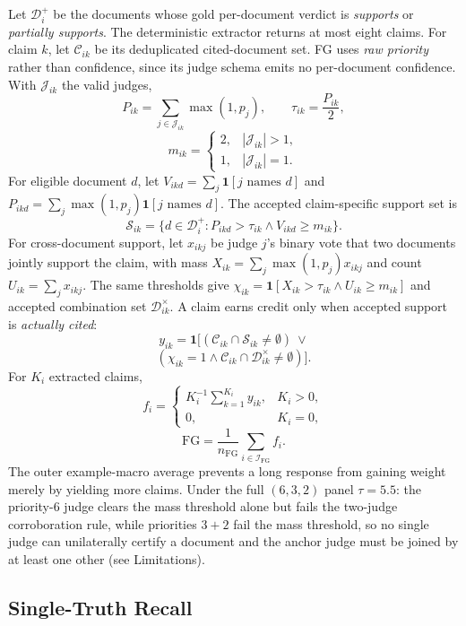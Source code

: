 Let $\mathcal{D}_i^{+}$ be the documents whose gold per-document verdict is
\textit{supports} or \textit{partially supports}. The deterministic extractor
returns at most eight claims. For claim $k$, let $\mathcal{C}_{ik}$ be its
deduplicated cited-document set. FG uses \emph{raw priority} rather than
confidence, since its judge schema emits no per-document confidence. With
$\mathcal{J}_{ik}$ the valid judges,
\[
P_{ik}=\!\!\sum_{j\in\mathcal{J}_{ik}}\!\!\max(1,p_j),\qquad
\tau_{ik}=\frac{P_{ik}}{2},
\]
\[
m_{ik}=\begin{cases}2,&|\mathcal{J}_{ik}|>1,\\ 1,&|\mathcal{J}_{ik}|=1.\end{cases}
\]
For eligible document $d$, let $V_{ikd}=\sum_j\mathbf{1}[j\text{ names }d]$ and
$P_{ikd}=\sum_j\max(1,p_j)\mathbf{1}[j\text{ names }d]$. The accepted
claim-specific support set is
\[
\mathcal{S}_{ik}=\{d\in\mathcal{D}_i^{+} : P_{ikd}>\tau_{ik} \wedge V_{ikd}\geq m_{ik}\}.
\]
For cross-document support, let $x_{ikj}$ be judge $j$'s binary vote that two
documents jointly support the claim, with mass $X_{ik}=\sum_j\max(1,p_j)x_{ikj}$
and count $U_{ik}=\sum_j x_{ikj}$. The same thresholds give
$\chi_{ik}=\mathbf{1}[X_{ik}>\tau_{ik}\wedge U_{ik}\geq m_{ik}]$ and accepted
combination set $\mathcal{D}^{\times}_{ik}$. A claim earns credit only when
accepted support is \emph{actually cited}:
\[
y_{ik}=\mathbf{1}\big[(\mathcal{C}_{ik}\cap\mathcal{S}_{ik}\neq\emptyset)
\ \vee
\]
\[
(\chi_{ik}=1 \wedge \mathcal{C}_{ik}\cap\mathcal{D}^{\times}_{ik}\neq\emptyset)\big].
\]
For $K_i$ extracted claims,
\[
f_i=\begin{cases}K_i^{-1}\sum_{k=1}^{K_i}y_{ik},&K_i>0,\\ 0,&K_i=0,\end{cases}
\]
\[
\mathrm{FG}=\frac{1}{n_{\mathrm{FG}}}\sum_{i\in\mathcal{I}_{\mathrm{FG}}}f_i.
\]
The outer example-macro average prevents a long response from gaining weight
merely by yielding more claims. Under the full $(6,3,2)$ panel $\tau=5.5$: the
priority-6 judge clears the mass threshold alone but fails the two-judge
corroboration rule, while priorities $3+2$ fail the mass threshold, so no single
judge can unilaterally certify a document and the anchor judge must be joined by
at least one other (see Limitations).

\subsection{Single-Truth Recall}

